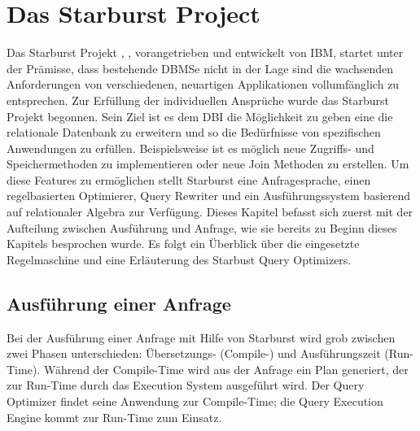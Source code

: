\section{Das Starburst Project}

Das Starburst Projekt \cite{lohman1988Starbust}, \cite{haas1989extensible}, vorangetrieben und entwickelt von IBM,  startet unter der Prämisse, dass bestehende DBMSe nicht in der Lage sind die wachsenden Anforderungen von verschiedenen, neuartigen Applikationen vollumfänglich zu entsprechen. Zur Erfüllung der individuellen Ansprüche wurde das Starburst Projekt begonnen. Sein Ziel ist es dem \ac{DBI} die Möglichkeit zu geben eine die relationale Datenbank zu erweitern und so die Bedürfnisse von spezifischen Anwendungen zu erfüllen. Beispielsweise ist es möglich neue Zugriffs- und Speichermethoden zu implementieren oder neue Join Methoden zu erstellen. Um diese Features zu ermöglichen stellt Starburst eine Anfragesprache, einen regelbasierten Optimierer, Query Rewriter und ein Ausführungssystem basierend auf relationaler Algebra zur Verfügung. Dieses Kapitel befasst sich zuerst mit der Aufteilung zwischen Ausführung und Anfrage, wie sie bereits zu Beginn dieses Kapitels besprochen wurde. Es folgt ein Überblick über die eingesetzte Regelmaschine und eine Erläuterung des Starbust Query Optimizers.

\subsection{Ausführung einer Anfrage}

Bei der Ausführung einer Anfrage mit Hilfe von Starburst wird grob zwischen zwei Phasen unterschieden: Übersetzungs- (Compile-) und Ausführungszeit (Run-Time). Während der Compile-Time wird aus der Anfrage ein Plan generiert, der zur Run-Time durch das Execution System ausgeführt wird. Der Query Optimizer findet seine Anwendung zur Compile-Time; die Query Execution Engine kommt zur Run-Time zum Einsatz.

